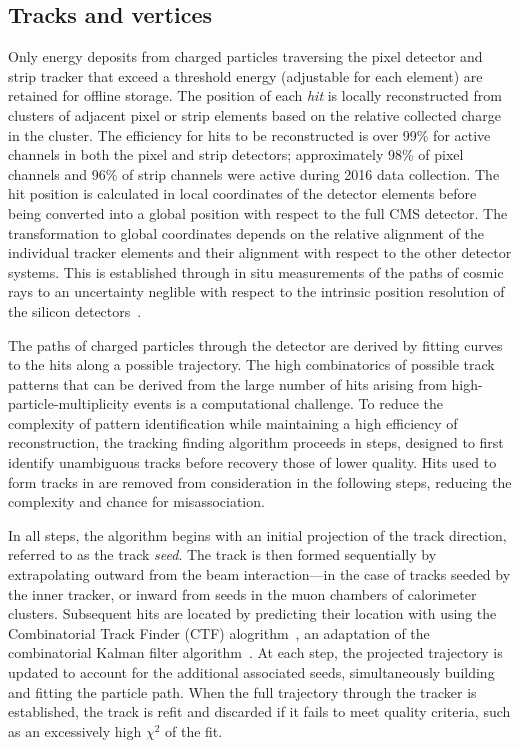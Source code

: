 \subsection{Tracks and vertices}
Only energy deposits from charged particles traversing the pixel detector and
strip tracker that exceed a threshold energy (adjustable for each element)
are retained for offline storage. The position of each \emph{hit} is locally
reconstructed from clusters of adjacent pixel or strip elements based
on the relative collected charge in the cluster. 
The efficiency for hits to be reconstructed is over 99\% for active 
channels in both the pixel and strip detectors; approximately 98\%
of pixel channels and 96\% of strip channels were active during 2016 data collection.
The hit position is calculated
in local coordinates of the detector elements before being converted
into a global position with respect to the full CMS detector. The transformation
to global coordinates depends on the relative alignment of the individual tracker
elements and their alignment with respect to the other detector systems.
This is established through in situ measurements of the paths of cosmic rays
to an uncertainty neglible with respect to the intrinsic position resolution 
of the silicon detectors~\cite{Chatrchyan:2014wfa}.

The paths of charged particles through the detector are derived by 
fitting curves to the hits along a possible trajectory. 
The high combinatorics of possible track patterns that can be derived
from the large number of hits arising from high-particle-multiplicity
events is a computational challenge.
To reduce the complexity of pattern identification
while maintaining a high efficiency of reconstruction, the tracking finding
algorithm proceeds in steps, designed to first identify unambiguous
tracks before recovery those of lower quality.
Hits used to form tracks in are removed from consideration in the following
steps, reducing the complexity and chance for misassociation.

In all steps, the algorithm begins with an initial projection of the track
direction, referred to as the track \emph{seed}. The track is then formed
sequentially by extrapolating outward from the beam interaction---in the 
case of tracks seeded by the inner tracker, or inward from seeds in the muon
chambers of calorimeter clusters. Subsequent hits are located 
by predicting their location with using the
Combinatorial Track Finder (CTF) alogrithm~\cite{Chatrchyan:2014fea}, 
an adaptation of the combinatorial Kalman filter algorithm~\cite{Billoir:1989mh}. 
At each step, the projected trajectory is updated to account for the additional
associated seeds, simultaneously building and fitting the particle path.
When the full trajectory through the tracker is established, the track
is refit and discarded if it fails to meet quality criteria, such as 
an excessively high $\chi^{2}$ of the fit.

